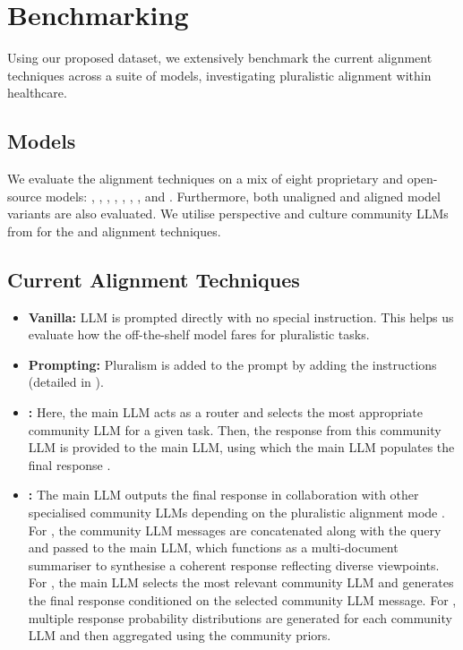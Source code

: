 
\section{Benchmarking}

Using our proposed \ourdataset dataset, we extensively benchmark the current alignment techniques across a suite of models, investigating pluralistic alignment within healthcare.

\subsection{Models} 
We evaluate the alignment techniques on a mix of eight proprietary and open-source models: \llamaSeven, \llamaThirteen, \llamaSeventy \citep{touvron2023llama}, \gemmaSeven \citep{team2024gemma}, \llamaEight \citep{dubey2024llama}, \qwenSeven, \qwenFourteen \citep{qwen2.5}, and \chatgpt \citep{achiam2023gpt}. Furthermore, both unaligned and aligned model variants are also evaluated. We utilise perspective and culture community LLMs from \citet{feng2024modular} for the \moe and \modplural alignment techniques. 

\subsection{Current Alignment Techniques}
\begin{itemize}[noitemsep,leftmargin=*]
\item \textbf{Vanilla:} LLM is prompted directly with no special instruction. This helps us evaluate how the off-the-shelf model fares for pluralistic tasks.
\item \textbf{Prompting:} Pluralism is added to the prompt by adding the instructions (detailed in ).
\item \textbf{\moe:} Here, the main LLM acts as a router and selects the most appropriate community LLM for a given task. Then, the response from this community LLM is provided to the main LLM, using which the main LLM populates the final response \citep{feng2024modular}.
\item \textbf{\modplural:} The main LLM outputs the final response in collaboration with other specialised community LLMs depending on the pluralistic alignment mode \citep{feng2024modular}. For \overton, the community LLM messages are concatenated along with the query and passed to the main LLM, which functions as a multi-document summariser to synthesise a coherent response reflecting diverse viewpoints. For \steerable, the main LLM selects the most relevant community LLM and generates the final response conditioned on the selected community LLM message. For \distributional, multiple response probability distributions are generated for each community LLM and then aggregated using the community priors.
\end{itemize}



